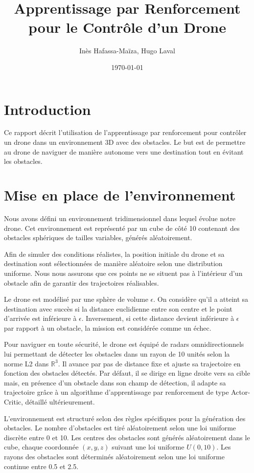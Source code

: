 \documentclass[a4paper, 12pt]{article}
\title{Apprentissage par Renforcement pour le Contrôle d'un Drone}
\author{Inès Hafassa-Maïza, Hugo Laval}
\date{\today}
\begin{document}
\maketitle

\section{Introduction}
Ce rapport décrit l'utilisation de l'apprentissage par renforcement pour contrôler un drone dans un environnement 3D avec des obstacles. Le but est de permettre au drone de naviguer de manière autonome vers une destination tout en évitant les obstacles.

\section{Mise en place de l’environnement}

Nous avons défini un environnement tridimensionnel dans lequel évolue notre drone. Cet environnement est représenté par un cube de côté 10 contenant des obstacles sphériques de tailles variables, générés aléatoirement.

Afin de simuler des conditions réalistes, la position initiale du drone et sa destination sont sélectionnées de manière aléatoire selon une distribution uniforme. Nous nous assurons que ces points ne se situent pas à l’intérieur d’un obstacle afin de garantir des trajectoires réalisables.

Le drone est modélisé par une sphère de volume $\epsilon$. On considère qu’il a atteint sa destination avec succès si la distance euclidienne entre son centre et le point d’arrivée est inférieure à $\epsilon$. Inversement, si cette distance devient inférieure à $\epsilon$ par rapport à un obstacle, la mission est considérée comme un échec.

Pour naviguer en toute sécurité, le drone est équipé de radars omnidirectionnels lui permettant de détecter les obstacles dans un rayon de 10 unités selon la norme L2 dans $\mathbb{R}^3$. Il avance par pas de distance fixe et ajuste sa trajectoire en fonction des obstacles détectés. Par défaut, il se dirige en ligne droite vers sa cible mais, en présence d’un obstacle dans son champ de détection, il adapte sa trajectoire grâce à un algorithme d’apprentissage par renforcement de type Actor-Critic, détaillé ultérieurement.

L’environnement est structuré selon des règles spécifiques pour la génération des obstacles. Le nombre d’obstacles est tiré aléatoirement selon une loi uniforme discrète entre 0 et 10. Les centres des obstacles sont générés aléatoirement dans le cube, chaque coordonnée $(x, y, z)$ suivant une loi uniforme $U(0, 10)$. Les rayons des obstacles sont déterminés aléatoirement selon une loi uniforme continue entre 0.5 et 2.5.
\end{document}
